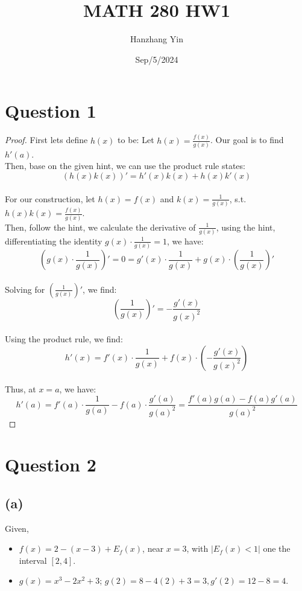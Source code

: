 \documentclass{article}
\title{MATH 280 HW1}
\author{Hanzhang Yin}
\date{Sep/5/2024}
\begin{document}
\maketitle

\section*{Question 1}

\begin{proof}
    
    First lets define $h(x)$ to be:
    Let \( h(x) = \frac{f(x)}{g(x)} \). Our goal is to find \( h'(a) \).
    \\
    Then, base on the given hint, we can use the product rule states:
    \[ (h(x)k(x))' = h'(x)k(x) + h(x)k'(x) \]
    \\
    For our construction, let \( h(x) = f(x) \) and \( k(x) = \frac{1}{g(x)} \), s.t. \( h(x)k(x) = \frac{f(x)}{g(x)} \).
    \\
    Then, follow the hint, we calculate the derivative of $\frac{1}{g(x)}$, using the hint, differentiating the identity \( g(x) \cdot \frac{1}{g(x)} = 1 \), we have:
    \[ (g(x) \cdot \frac{1}{g(x)})' = 0 = g'(x) \cdot \frac{1}{g(x)} + g(x) \cdot (\frac{1}{g(x)})' \]
    \\
    Solving for \( (\frac{1}{g(x)})' \), we find:
    \[ (\frac{1}{g(x)})' = -\frac{g'(x)}{g(x)^2} \]
    \\
    Using the product rule, we find:
    \[ h'(x) = f'(x) \cdot \frac{1}{g(x)} + f(x) \cdot \left(-\frac{g'(x)}{g(x)^2}\right) \]
    \\
    Thus, at \( x = a \), we have:
    \[ h'(a) = f'(a) \cdot \frac{1}{g(a)} - f(a) \cdot \frac{g'(a)}{g(a)^2} = \frac{f'(a)g(a) - f(a)g'(a)}{g(a)^2} \]

\end{proof}

\section*{Question 2}

\subsection*{(a)}
Given,
\begin{itemize}
    \item $f(x) = 2 - (x - 3) + E_f(x)$, near $x = 3$, with $|E_f(x) < 1|$ one the interval $[2,4]$.
    \item $g(x) = x^3 - 2x^2 + 3$; $g(2) = 8 - 4(2) + 3 = 3, g'(2) = 12 - 8 = 4$.
\end{itemize}
\end{document}
